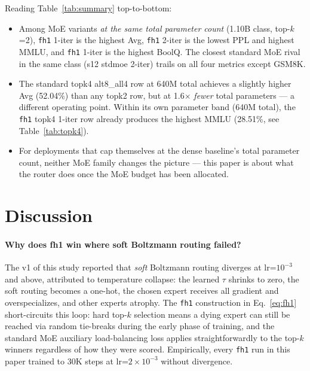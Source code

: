 \documentclass[oneside]{article}
\begin{document}
Reading Table~\ref{tab:summary} top-to-bottom:

\begin{itemize}[leftmargin=1.5em]
  \item Among MoE variants \emph{at the same total parameter count} (1.10B class, top-$k$=2), \texttt{fh1} 1-iter is the highest Avg, \texttt{fh1} 2-iter is the lowest PPL and highest MMLU, and \texttt{fh1} 1-iter is the highest BoolQ. The closest standard MoE rival in the same class (s12 stdmoe 2-iter) trails on all four metrics except GSM8K.
  \item The standard topk4 alt8\_all4 row at 640M total achieves a slightly higher Avg (52.04\%) than any topk2 row, but at 1.6$\times$ \emph{fewer} total parameters --- a different operating point. Within its own parameter band (640M total), the \texttt{fh1} topk4 1-iter row already produces the highest MMLU (28.51\%, see Table~\ref{tab:topk4}).
  \item For deployments that cap themselves at the dense baseline's total parameter count, neither MoE family changes the picture --- this paper is about what the router does once the MoE budget has been allocated.
\end{itemize}


\section{Discussion}

\paragraph{Why does fh1 win where soft Boltzmann routing failed?} The v1 of this study reported that \emph{soft} Boltzmann routing diverges at lr=$10^{-3}$ and above, attributed to temperature collapse: the learned $\tau$ shrinks to zero, the soft routing becomes a one-hot, the chosen expert receives all gradient and overspecializes, and other experts atrophy. The \texttt{fh1} construction in Eq.~\ref{eq:fh1} short-circuits this loop: hard top-$k$ selection means a dying expert can still be reached via random tie-breaks during the early phase of training, and the standard MoE auxiliary load-balancing loss applies straightforwardly to the top-$k$ winners regardless of how they were scored. Empirically, every \texttt{fh1} run in this paper trained to 30K steps at lr=$2\times 10^{-3}$ without divergence.
\end{document}
